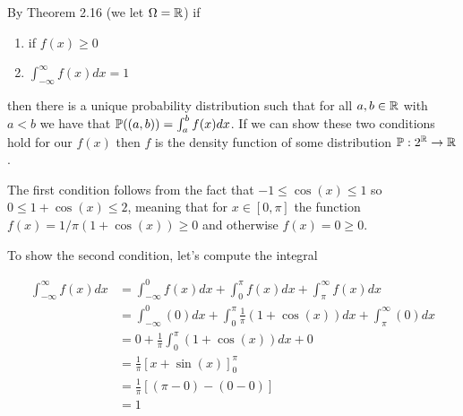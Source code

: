 
By Theorem 2.16 (we let $ \Omega = \R$) if
\begin{enumerate}
    \item if $ f(x) \geq 0$
    \item $ \int_{-\infty}^{\infty} f(x) dx = 1$
\end{enumerate}
then there is a unique probability distribution such that for all $ a, b \in \R$ with $ a < b$ we
have that $ \P((a,b)) = \int_{a}^{b} f(x) dx$. If we can show these two conditions hold for our $
f(x)$ then $ f$ is the density function of some distribution $ \P: 2^{\R} \to \R$. 

The first condition follows from the fact that $ -1 \leq \cos(x) \leq 1 $ so $ 0\leq 1+ \cos(x) \leq
2$, meaning that for $ x\in [0,\pi]$ the function $ f(x) = 1/\pi (1+ \cos(x)) \geq 0$ and otherwise
$ f(x) = 0 \geq 0$. 

To show the second condition, let's compute the integral 

\begin{align*}
    \int_{-\infty}^{\infty} f(x) dx &= \int_{-\infty}^{0} f(x) dx + \int_{0}^{\pi} f(x) dx +
    \int_{\pi}^{\infty}f(x) dx \\
				    &= \int_{-\infty}^{0} (0) dx + \int_{0}^{\pi} \frac{1}{\pi}
				    (1+\cos(x)) dx + \int_{\pi}^{\infty}(0) dx\\
				    &= 0 + \frac{1}{\pi} \int_{0}^{\pi} (1+\cos(x)) dx + 0 \\
				    &= \frac{1}{\pi} \left[ x + \sin(x)  \right]_{0}^{\pi} \\
				    &= \frac{1}{\pi} \left[ (\pi-0) - (0-0)  \right] \\
				    &= 1
\end{align*}
